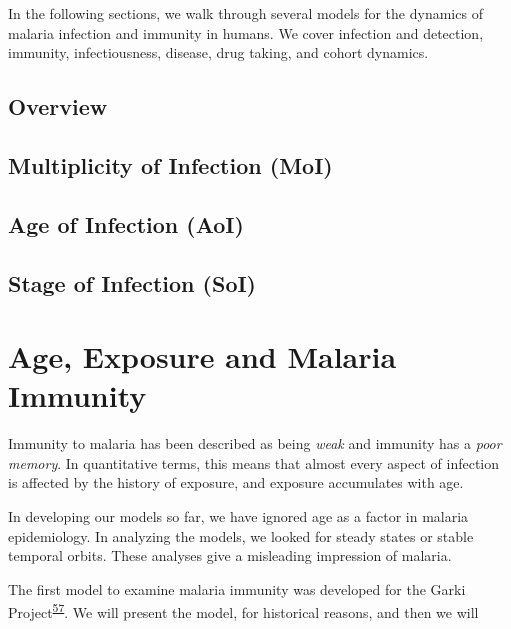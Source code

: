 \documentclass[
]{book}
\begin{document}
In the following sections, we walk through several models for the dynamics of malaria infection and immunity in humans. We cover infection and detection, immunity, infectiousness, disease, drug taking, and cohort dynamics.

\hypertarget{overview-1}{%
\section{Overview}\label{overview-1}}

\hypertarget{multiplicity-of-infection-moi}{%
\section{Multiplicity of Infection (MoI)}\label{multiplicity-of-infection-moi}}

\hypertarget{age-of-infection-aoi}{%
\section{Age of Infection (AoI)}\label{age-of-infection-aoi}}

\hypertarget{stage-of-infection-soi}{%
\section{Stage of Infection (SoI)}\label{stage-of-infection-soi}}

\hypertarget{age-exposure-and-malaria-immunity}{%
\chapter{Age, Exposure and Malaria Immunity}\label{age-exposure-and-malaria-immunity}}

Immunity to malaria has been described as being \emph{weak} and immunity has a \emph{poor memory}. In quantitative terms, this means that almost every aspect of infection is affected by the history of exposure, and exposure accumulates with age.

In developing our models so far, we have ignored age as a factor in malaria epidemiology. In analyzing the models, we looked for steady states or stable temporal orbits. These analyses give a misleading impression of malaria.

The first model to examine malaria immunity was developed for the Garki Project\textsuperscript{\protect\hyperlink{ref-DietzK1974GarkiModel}{57}}. We will present the model, for historical reasons, and then we will
\end{document}
